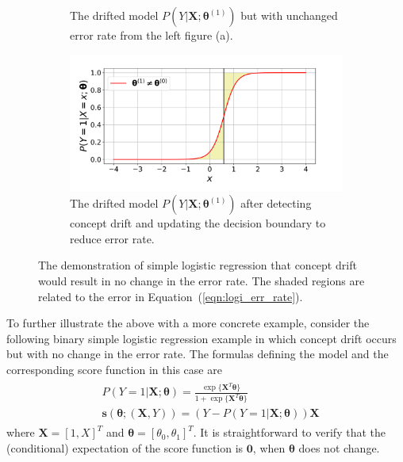\documentclass[twoside,11pt]{article}
\begin{document}
\begin{figure}[!htbp]
\begin{subfigure}[t]{0.4\linewidth}
         \captionsetup{width=.95\linewidth}
         \caption{The drifted model $P(Y|\bm{X};\bm{\theta}^{(1)})$ but with unchanged error rate from the left figure (a).}
         \label{fig:logi_err_rate_unch_b}
  \end{subfigure}
  \begin{subfigure}[t]{0.4\linewidth}
         \centering
	 \includegraphics[width=\textwidth, trim=.2in .2in .7in .45in, clip]{../figures/v14/demons_fig/2D_logi_cd_updated.png}
         \captionsetup{width=.95\linewidth}
         \caption{The drifted model $P(Y|\bm{X};\bm{\theta}^{(1)})$ after detecting concept drift and updating the decision boundary to reduce error rate.}
         \label{fig:logi_err_rate_unch_d}
  \end{subfigure}
  \caption{The demonstration of simple logistic regression that concept drift would result in no change in the error rate. The shaded regions are related to the error in Equation~(\ref{eqn:logi_err_rate}).}
  \label{fig:logi_err_rate_unch}
\end{figure}

To further illustrate the above with a more concrete example, consider the following binary simple logistic regression example in which concept drift occurs but with no change in the error rate. The formulas defining the model and the corresponding score function in this case are
\begin{align}
\begin{aligned}
&P(Y=1|\bm{X};\bm{\theta}) = \frac{\exp\{\bm {X}^{T} \bm {\theta}\}}{1+\exp\{\bm {X}^{T} \bm {\theta}\}} \\
&\bm {s}(\bm { \theta} ; (\bm {X}, Y)) = (Y-P(Y=1|\bm{X};\bm{\theta}))\bm {X}
\end{aligned}
\label{eqn:logi_mod_score}
\end{align}
where $\bm{X} = [1, X]^T$ and $\bm{\theta}=[\theta_0, \theta_1]^T$. It is straightforward to verify that the (conditional) expectation of the score function is $\bm {0}$, when $\bm{\theta}$ does not change.
\end{document}
